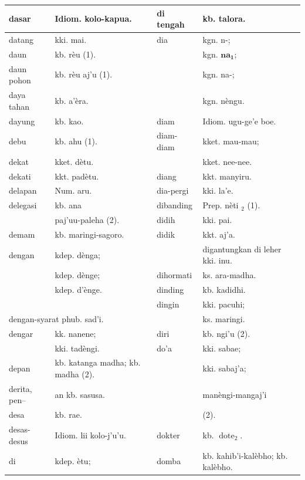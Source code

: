 \documentclass[10pt]{article}
\begin{document}
\begin{center}
\begin{tabular}{|l|l|l|l|}
\hline
dasar & Idiom. kolo-kapua. & di tengah & kb. talora. \\
\hline
datang & kki. mai. & dia & kgn. n-; \\
\hline
daun & kb. rèu (1). &  & kgn. \(\mathbf{n a}_{\mathbf{1}}\); \\
\hline
daun pohon & kb. rèu aj'u (1). &  & kgn. na-; \\
\hline
daya tahan & kb. a'èra. &  & kgn. nèngu. \\
\hline
dayung & kb. kao. & diam & Idiom. ugu-ge'e boe. \\
\hline
debu & kb. ahu (1). & diam-diam & kket. mau-mau; \\
\hline
dekat & kket. dètu. &  & kket. nee-nee. \\
\hline
dekati & kkt. padètu. & diang & kkt. manyiru. \\
\hline
delapan & Num. aru. & dia-pergi & kki. la'e. \\
\hline
delegasi & kb. ana & dibanding & Prep. nèti \({ }_{2}\) (1). \\
\hline
 & paj'uu-paleha (2). & didih & kki. pai. \\
\hline
demam & kb. maringi-sagoro. & didik & kkt. aj'a. \\
\hline
dengan & kdep. dènga; &  & digantungkan di leher kki. inu. \\
\hline
 & kdep. dènge; & dihormati & ks. ara-madha. \\
\hline
 & kdep. d'ènge. & dinding & kb. kadidhi. \\
\hline
\multicolumn{2}{|c|}{} & dingin & kki. pacuhi; \\
\hline
\multicolumn{2}{|l|}{dengan-syarat phub. sad'i.} &  & ks. maringi. \\
\hline
dengar & kk. nanene; & diri & kb. ngi'u (2). \\
\hline
 & kki. tadèngi. & do'a & kki. sabae; \\
\hline
depan & kb. katanga madha; kb. madha (2). &  & kki. sabaj'a; \\
\hline
derita, pen-- & an kb. sasusa. &  & manèngi-mangaj'i \\
\hline
desa & kb. rae. &  & (2). \\
\hline
desas-desus & Idiom. lii kolo-j'u'u. & dokter & kb. \(\operatorname{dote}_{2}\). \\
\hline
di & kdep. ètu; & domba & kb. kahib'i-kalèbho; kb. kalèbho. \\

\end{tabular}
\end{center}
\end{document}
